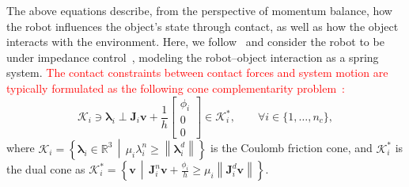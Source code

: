 The above equations describe, from the perspective of momentum balance, how the robot influences the object's state through contact, as well as how the object interacts with the environment.
Here, we follow~\cite{pang2021convex,jin2024complementarity} and consider the robot to be under impedance control~\cite{hogan1984impedance}, modeling the robot--object interaction as a spring system.
\textcolor{red}{
The contact constraints between contact forces and system motion are typically formulated as the following cone complementarity problem~\cite{anitescu2010iterative}:
}
\begin{equation}
 \mathcal{K}_i
 \ni
 \boldsymbol{\lambda}_i
 \perp
 \boldsymbol{J}_i\boldsymbol{v}
 +
 \frac{1}{h}
 \begin{bmatrix}
 \phi_i \\
 0 \\
 0
 \end{bmatrix}
 \in
 \mathcal{K}_i^{*},
 \qquad
 \forall i\in\{1,\ldots,n_c\},
 \label{equ.complementarity_constraint}
\end{equation}
\noindent where
 $\mathcal{K}_i
 =
 \left\{
 \boldsymbol{\lambda}_i\in\mathbb{R}^{3}
 \,\middle|\,
 \mu_i\lambda_i^{n}
 \geq
 \left\|\boldsymbol{\lambda}_i^{d}\right\|
 \right\}$
is the Coulomb friction cone, and $\mathcal{K}_i^{*}$ is the dual cone as
 $\mathcal{K}_i^{*}=\left\{
 \boldsymbol{v}
 \,\middle|\,
 \boldsymbol{J}_i^{n}\boldsymbol{v}
 +
 \frac{\phi_i}{h}
 \geq
 \mu_i
 \left\|
 \boldsymbol{J}_i^{d}\boldsymbol{v}
 \right\|
 \right\}$.

